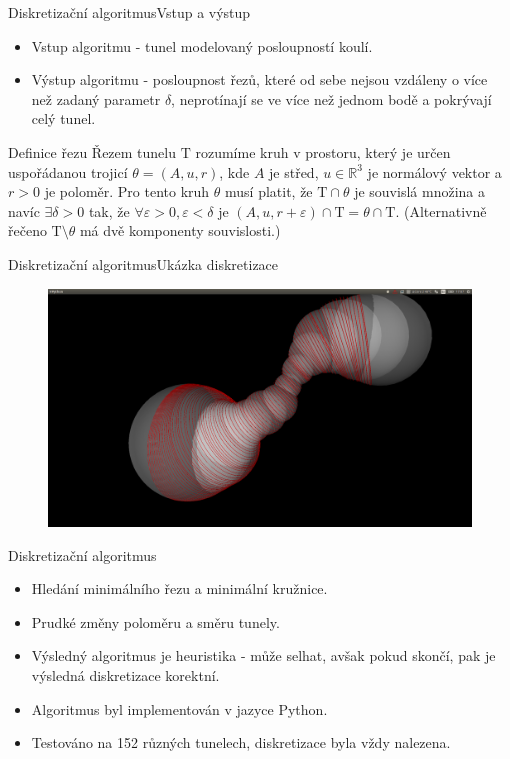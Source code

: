 \documentclass{beamer}
\newcommand{\Rbb}{\mathbb{R}}
\newcommand{\Tau}{\mathrm{T}}
\begin{document}
\begin{frame}{Diskretizační algoritmus}{Vstup a výstup}
\begin{itemize}
	\item Vstup algoritmu - tunel modelovaný posloupností koulí.
	\item Výstup algoritmu - posloupnost řezů, které od sebe nejsou vzdáleny o více než zadaný parametr $ \delta $, neprotínají se ve více než jednom bodě a pokrývají celý tunel.
\end{itemize}

\begin{block}{Definice řezu}
Řezem tunelu $ \Tau $ rozumíme kruh v prostoru, který je určen uspořádanou trojicí
$\theta = (A, u, r)$, kde $ A $ je střed, $ u \in \Rbb^3 $ je normálový vektor a $ r > 0 $ je poloměr.
Pro tento kruh $ \theta $ musí platit, že $ \Tau \cap \theta $ je souvislá množina a navíc
$ \exists \delta > 0 $ tak, že $ \forall \varepsilon > 0,  \varepsilon < \delta $ je
$ (A, u, r + \varepsilon) \cap \Tau = \theta \cap \Tau $.
(Alternativně řečeno $\Tau \setminus \theta $ má dvě komponenty souvislosti.)
\end{block}

\end{frame}

\begin{frame}{Diskretizační algoritmus}{Ukázka diskretizace}
    \begin{figure}
        \includegraphics[width=\textwidth]{img/weighted_dir.png}
    \end{figure}
\end{frame}

\begin{frame}{Diskretizační algoritmus}
    \begin{itemize}
	\item Hledání minimálního řezu a minimální kružnice.
	\item Prudké změny poloměru a směru tunely.
	\item Výsledný algoritmus je heuristika - může selhat, avšak pokud skončí, pak je výsledná diskretizace korektní.
	\item Algoritmus byl implementován v jazyce Python.
	\item Testováno na 152 různých tunelech, diskretizace byla vždy nalezena.
	\end{itemize}
\end{frame}
\end{document}
